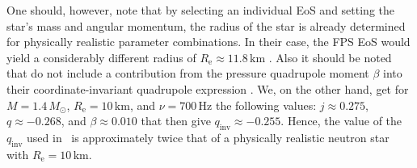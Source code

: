 \documentclass{aa}
\newcommand{\refe}[1]{#1}
\newcommand{\refedel}[1]{}
\newcommand{\Msun}{\ensuremath{M_{\odot}}}
\newcommand{\qinv}{\ensuremath{q_{\mathrm{inv}}}}
\begin{document}
One should, however, note that by \refe{selecting an individual EoS} and setting the \refe{star's mass and angular momentum}, the radius of the star is already determined for physically realistic parameter combinations.
In their case, the FPS EoS would yield \refe{a considerably different radius of} $R_{\mathrm{e}} \approx 11.8\,\mathrm{km}$ \citep{CST94, LP99}.
Also it should be noted that \citet{BPO13} do not include a contribution from the pressure quadrupole moment $\beta$ into their coordinate-invariant quadrupole expression \citep{PA12}.
\refe{We, on the other hand, get for} $M=1.4\,\Msun$, $R_{\mathrm{e}}=10\,\mathrm{km}$, and $\nu = 700\,\mathrm{Hz}$ the following values: 
$j \approx 0.275$, $q \approx -0.268$, and $\beta \approx 0.010$ that then give $\qinv \approx -0.255$.
Hence, the value of the $\qinv$ used in \citet{BPO13} is approximately twice that of a physically realistic neutron star with $R_{\mathrm{e}} = 10\,\mathrm{km}$.
\end{document}
